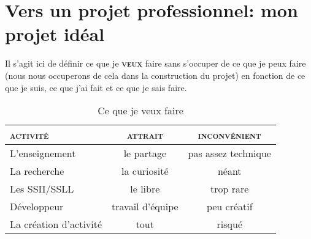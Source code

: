 \documentclass[a4paper,12pt, draft]{report}
\newcommand{\tabTitle}[1]{\hfill{} \textsc{#1} \hfill{} }
\begin{document}
\chapter[Mon projet idéal]{Vers un projet professionnel: mon projet idéal}
Il s'agit ici de définir ce que je \textsc{\textbf{veux}} faire sans s'occuper de ce que je peux faire (nous nous occuperons de cela dans la construction du projet) en fonction de ce que je suis, ce que j'ai fait et ce que je sais faire.


\begin{table}[h]
\begin{center}
\begin{tabular}{|l|c|c|}
  \hline
  \tabTitle{activité} & \tabTitle{attrait} & \tabTitle{inconvénient}\\
  \hline
  \hline
  L'enseignement & le partage & pas assez technique\\
  \hline
  La recherche & la curiosité & néant \\
  \hline
  Les SSII\footnotemark{}/SSLL\footnotemark{} & le libre & trop rare\\
  \hline
  Développeur & travail d'équipe & peu créatif\\
  \hline
  La création d'activité & tout & risqué\\
  \hline
\end{tabular}
\end{center}
\caption{Ce que je veux faire}
\end{table}

\end{document}
